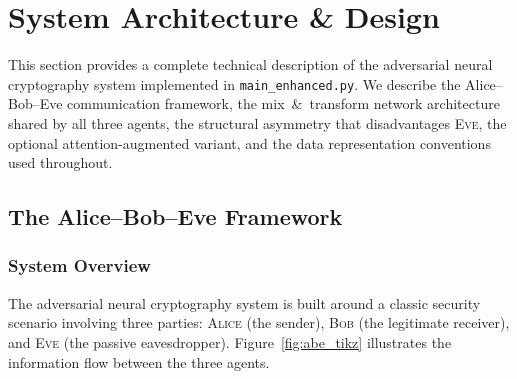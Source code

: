 \documentclass[12pt, a4paper]{article}
\newcommand{\alice}{\textsc{Alice}}
\newcommand{\bob}{\textsc{Bob}}
\newcommand{\eve}{\textsc{Eve}}
\newcommand{\code}[1]{\texttt{\color{CodeRed}#1}}
\begin{document}
\newpage
\section{System Architecture \& Design}
\label{sec:architecture}

This section provides a complete technical description of the adversarial
neural cryptography system implemented in \code{main\_enhanced.py}.
We describe the Alice--Bob--Eve communication framework, the mix~\&~transform
network architecture shared by all three agents, the structural asymmetry
that disadvantages \eve{}, the optional attention-augmented variant, and the
data representation conventions used throughout.

\subsection{The Alice--Bob--Eve Framework}
\label{subsec:abe_framework}

\subsubsection*{System Overview}

The adversarial neural cryptography system is built around a classic
security scenario involving three parties: \alice{} (the sender),
\bob{} (the legitimate receiver), and \eve{} (the passive eavesdropper).
Figure~\ref{fig:abe_tikz} illustrates the information flow between the
three agents.
\end{document}
